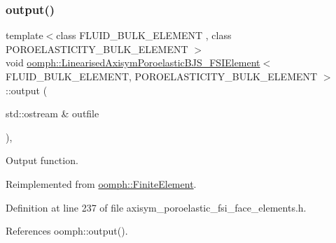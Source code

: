 \subsubsection{\texorpdfstring{output()}{output()}\hspace{0.1cm}{\footnotesize\ttfamily [1/4]}}
{\footnotesize\ttfamily template$<$class F\+L\+U\+I\+D\+\_\+\+B\+U\+L\+K\+\_\+\+E\+L\+E\+M\+E\+NT , class P\+O\+R\+O\+E\+L\+A\+S\+T\+I\+C\+I\+T\+Y\+\_\+\+B\+U\+L\+K\+\_\+\+E\+L\+E\+M\+E\+NT $>$ \\
void \hyperlink{classoomph_1_1LinearisedAxisymPoroelasticBJS__FSIElement}{oomph\+::\+Linearised\+Axisym\+Poroelastic\+B\+J\+S\+\_\+\+F\+S\+I\+Element}$<$ F\+L\+U\+I\+D\+\_\+\+B\+U\+L\+K\+\_\+\+E\+L\+E\+M\+E\+NT, P\+O\+R\+O\+E\+L\+A\+S\+T\+I\+C\+I\+T\+Y\+\_\+\+B\+U\+L\+K\+\_\+\+E\+L\+E\+M\+E\+NT $>$\+::output (\begin{DoxyParamCaption}\item[{std\+::ostream \&}]{outfile }\end{DoxyParamCaption})\hspace{0.3cm}{\ttfamily [inline]}, {\ttfamily [virtual]}}



Output function. 



Reimplemented from \hyperlink{classoomph_1_1FiniteElement_a2ad98a3d2ef4999f1bef62c0ff13f2a7}{oomph\+::\+Finite\+Element}.



Definition at line 237 of file axisym\+\_\+poroelastic\+\_\+fsi\+\_\+face\+\_\+elements.\+h.



References oomph\+::output().

\mbox{\label{classoomph_1_1LinearisedAxisymPoroelasticBJS__FSIElement_a22f814c3e375302e323fdd3b021c10f8}} 
